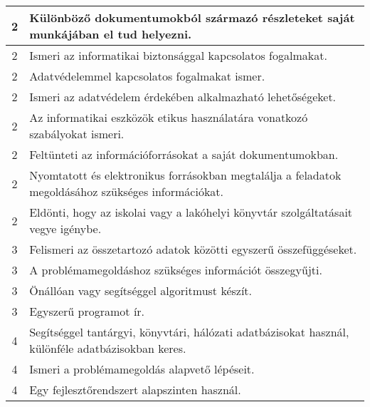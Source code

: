\begin{longtable}{c | p{} }
                                
                                          2 &  Különböző dokumentumokból származó részleteket saját munkájában el tud helyezni. \\ \hline
                                          2 &  Ismeri az informatikai biztonsággal kapcsolatos fogalmakat. \\ \hline
                                          2 &  Adatvédelemmel kapcsolatos fogalmakat ismer. \\ \hline
                                          2 &  Ismeri az adatvédelem érdekében alkalmazható lehetőségeket. \\ \hline
                                          2 &  Az informatikai eszközök etikus használatára vonatkozó szabályokat ismeri. \\ \hline
                                          2 &  Feltünteti az információforrásokat a saját dokumentumokban. \\ \hline
                                          2 &  Nyomtatott és elektronikus forrásokban megtalálja a feladatok megoldásához szükséges információkat. \\ \hline
                                          2 &  Eldönti, hogy az iskolai vagy a lakóhelyi könyvtár szolgáltatásait vegye igénybe. \\ \hline
                                      
                                
                                          3 &  Felismeri az összetartozó adatok közötti egyszerű összefüggéseket. \\ \hline
                                          3 &  A problémamegoldáshoz szükséges információt összegyűjti. \\ \hline
                                          3 &  Önállóan vagy segítséggel algoritmust készít. \\ \hline
                                          3 &  Egyszerű programot ír. \\ \hline
                                      
                                
                                          4 &  Segítséggel tantárgyi, könyvtári, hálózati adatbázisokat használ, különféle adatbázisokban keres. \\ \hline
                                          4 &  Ismeri a problémamegoldás alapvető lépéseit. \\ \hline
                                          4 &  Egy fejlesztőrendszert alapszinten használ. \\ \hline
                                      
                        \end{longtable}
            \clearpage

